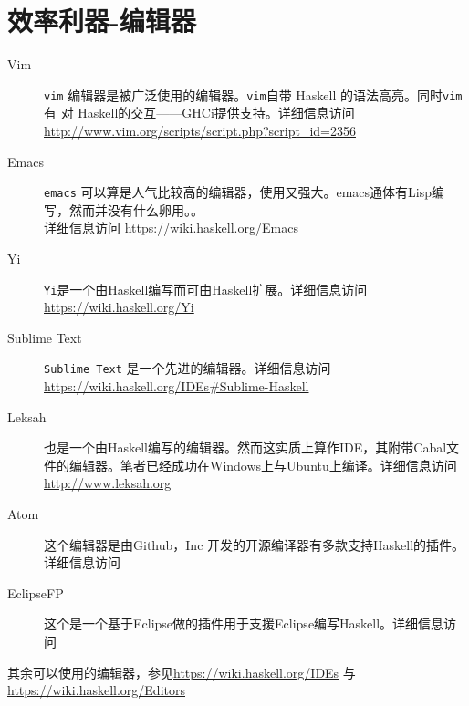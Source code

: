 \section{效率利器-编辑器}
\begin{description}
  \item[Vim]\verb"vim" 编辑器是被广泛使用的编辑器。\verb"vim"自带 Haskell 的语法高亮。同时\verb"vim" 有 对 Haskell的交互——GHCi提供支持。详细信息访问\url{http://www.vim.org/scripts/script.php?script_id=2356}   
  \item[Emacs]\verb"emacs" 可以算是人气比较高的编辑器，使用又强大。emacs通体有Lisp编写，然而并没有什么卵用。。\\ 详细信息访问
  \url{https://wiki.haskell.org/Emacs}
  \item[Yi]\verb"Yi"是一个由Haskell编写而可由Haskell扩展。详细信息访问\url{https://wiki.haskell.org/Yi}
  \item[Sublime Text] \verb"Sublime Text" 是一个先进的编辑器。详细信息访问\url{https://wiki.haskell.org/IDEs#Sublime-Haskell}
  \item[Leksah] 也是一个由Haskell编写的编辑器。然而这实质上算作IDE，其附带Cabal文件的编辑器。笔者已经成功在Windows上与Ubuntu上编译。详细信息访问\url{http://www.leksah.org}
  \item[Atom] 这个编辑器是由Github，Inc 开发的开源编译器有多款支持Haskell的插件。详细信息访问\url{}
  \item[EclipseFP] 这个是一个基于Eclipse做的插件用于支援Eclipse编写Haskell。详细信息访问\url{}
\end{description}
其余可以使用的编辑器，参见\url{https://wiki.haskell.org/IDEs} 与 \url{https://wiki.haskell.org/Editors}
\endinput 